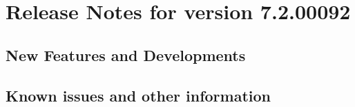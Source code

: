 
\section{Release Notes for version 7.2.00092}

\subsection{New Features and Developments}


\subsection{Known issues and other information}


